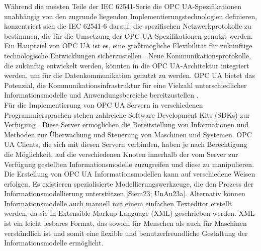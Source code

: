 Während die meisten Teile der IEC 62541-Serie die OPC UA-Spezifikationen unabhängig von den zugrunde liegenden Implementierungstechnologien definieren, konzentriert sich die IEC 62541-6 \cite{dkedeutschekommissionelektrotechnikelektronikinformationstechnikindinundvdeOPCUnifiedArchitecture2021a} darauf, die spezifischen Netzwerkprotokolle zu bestimmen, die für die Umsetzung der OPC UA-Spezifikationen genutzt werden. Ein Hauptziel von OPC UA ist es, eine größtmögliche Flexibilität für zukünftige technologische Entwicklungen sicherzustellen \cite{ensteOPCUnifiedArchitecture2011}. Neue Kommunikationsprotokolle, die zukünftig entwickelt werden, könnten in die OPC UA-Architektur integriert werden, um für die Datenkommunikation genutzt zu werden. OPC UA bietet das Potenzial, die Kommunikationsinfrastruktur für eine Vielzahl unterschiedlicher Informationsmodelle und Anwendungsbereiche bereitzustellen \cite{fuhrlander-volkerAutomationArchitectureDemand}.\\

Für die Implementierung von OPC UA Servern in verschiedenen Programmiersprachen stehen zahlreiche Software Development Kits (SDKs) zur Verfügung \cite{shilengeOptimizationOperationalInformation2022a}. Diese Server ermöglichen die Bereitstellung von Informationen und Methoden zur Überwachung und Steuerung von Maschinen und Systemen. OPC UA Clients, die sich mit diesen Servern verbinden, haben je nach Berechtigung die Möglichkeit, auf die verschiedenen Knoten innerhalb der vom Server zur Verfügung gestellten Informationsmodelle zuzugreifen und diese zu manipulieren. Die Erstellung von OPC UA Informationsmodellen kann auf verschiedene Weisen erfolgen. Es existieren spezialisierte Modellierungswerkzeuge, die den Prozess der Informationsmodellierung unterstützen [Siem23; UnAu23a]. Alternativ können Informationsmodelle auch manuell mit einem einfachen Texteditor erstellt werden, da sie in Extensible Markup Language (XML) geschrieben werden. XML ist ein leicht lesbares Format, das sowohl für Menschen als auch für Maschinen verständlich ist und somit eine flexible und benutzerfreundliche Gestaltung der Informationsmodelle ermöglicht.\\

